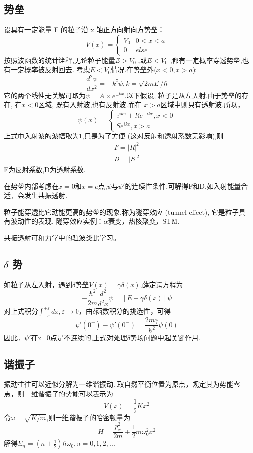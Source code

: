 \documentclass[13pt,a4paper]{article}
\begin{document}
\begin{CJK}{UTF8}{song}
\subsection{势垒}
设具有一定能量 E 的粒子沿 x 轴正方向射向方势垒：$$V(x)=\left\{\begin{array}{lc}{V_{0} }&{ 0<x<a}\\{0 }&{ else}
\end{array}\right.$$
按照波函数的统计诠释,无论粒子能量$E>V_0$ ,或$E<V_0$ ,都有一定概率穿透势垒,也有一定概率被反射回去.
考虑$E<V_0$情况.在势垒外($x<0, x>a$):$$\frac{d^2\psi}{dx^2}=-k^2\psi,k=\sqrt{2mE}/\hbar$$
它的两个线性无关解可取为$\psi=A\times e^{\pm kx}$.以下假设, 粒子是从左入射.由于势垒的存在, 在$x<0$区域, 既有入射波,也有反射波.而在 $x > a$区域中则只有透射波.所以，
$$\psi(x)=\left\{\begin{array}{lc}{e^{ike}+Re^{-ike}}{,x<0}\\{Se^{ike}}{,x>a}\end{array}\right.
$$上式中入射波的波幅取为1,只是为了方便 (这对反射和透射系数无影响),则
$$\begin{array}{c}{F
=|R|^2}\\{ D
=|S|^2}
  \end{array}
$$F为反射系数,D为透射系数.

在势垒内部考虑在$x=0$和$x=a$点,$\psi$与$\psi'$的连续性条件,可解得F和D.如入射能量合适，会发生共振透射.

粒子能穿透比它动能更高的势垒的现象,称为隧穿效应 (tunnel effect), 它是粒子具有波动性的表现.
隧穿效应实例：$\alpha$衰变，热核聚变，STM.

共振透射可和力学中的驻波类比学习。


\subsection{$\delta$ 势}
如粒子从左入射，遇到$\delta$势垒$V(x)=\gamma\delta(x)$,薛定谔方程为$$-\frac{\hbar^2}{2m}\frac{d^2}{d^2x}\psi=[E-\gamma\delta(x)]\psi$$对上式积分$\int^{+\varepsilon}_{-\varepsilon}dx,\varepsilon\rightarrow 0$，由$\delta$函数积分的挑选性，可得$$\psi'(0^+)-\psi'(0^-)=\frac{2m\gamma}{\hbar^2}\psi(0)$$因此，$\psi'$在x=0点是不连续的,上式对处理$\delta$势场问题中起关键作用.

\subsection{谐振子}
振动往往可以近似分解为一维谐振动. 取自然平衡位置为原点，规定其为势能零点，则一维谐振子的势能可以表示为$$V(x)=\frac{1}{2}Kx^2$$
令$\omega=\sqrt{K/m}$,则一维谐振子的哈密顿量为$$H=\frac{p^2_x}{2m}+\frac{1}{2}m\omega_0^2x^2$$
解得$E_n=(n+\frac{1}{2})\hbar\omega_0,n=0,1,2,...$



\end{CJK}
\end{document}
